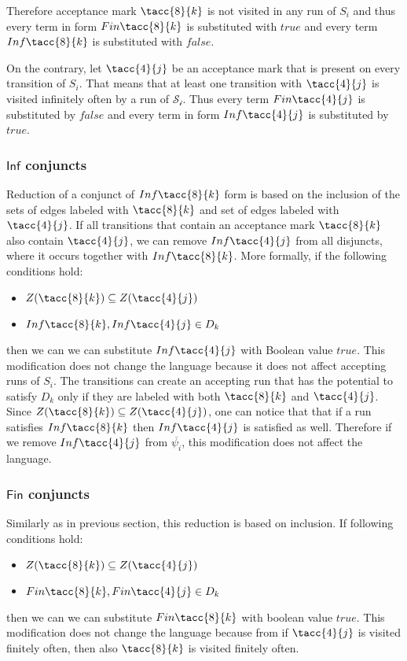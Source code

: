 \documentclass[a4paper,UKenglish,cleveref, autoref, anonymous, thm-restate]{lipics-v2021}
\def\Inf{\ensuremath{\mathsf{Inf}}}
\def\Fin{\ensuremath{\mathsf{Fin}}}
\def\false{\mathit{false}}
\def\true{\mathit{true}}
\begin{document}
Therefore acceptance mark $\tacc{8}{k}$ is not visited in any run of $S_{i}$ and thus every term in form $\Fin\tacc{8}{k}$ is substituted with $\true$ and every term $\Inf\tacc{8}{k}$ is substituted with $\false$.

On the contrary, let $\tacc{4}{j}$ be an acceptance mark that is present on every transition of $S_{i}$. That means that at least one transition with $\tacc{4}{j}$ is visited infinitely often by a run of $\mathcal{S_{i}}$. Thus every term $\Fin\tacc{4}{j}$ is substituted by $\false$ and every term in form $\Inf\tacc{4}{j}$ is substituted by $\true$. 

\subsubsection{$\Inf$ conjuncts\\}
\label{subsection:simpl_inf}
Reduction of a conjunct of $\Inf\tacc{8}{k}$ form  is based on the inclusion of the sets of edges labeled with $\tacc{8}{k}$ and set of edges labeled with $\tacc{4}{j}$. If all transitions that contain an acceptance mark $\tacc{8}{k}$ also contain $\tacc{4}{j}$, we can remove $\Inf\tacc{4}{j}$ from all disjuncts, where it occurs together with $\Inf\tacc{8}{k}$. 
More formally, if the following conditions hold:
\begin{itemize}
    \item $Z(\tacc{8}{k}) \subseteq Z(\tacc{4}{j})$
    \item $\Inf\tacc{8}{k}, \Inf\tacc{4}{j} \in D_{k}$
\end{itemize}
then we can we can substitute $\Inf\tacc{4}{j}$ with Boolean value $\true$. 
This modification does not change the language because it does not affect accepting runs of $S_{i}$. The transitions can create an accepting run that has the potential to satisfy $D_{k}$ only if they are labeled with both  $\tacc{8}{k}$  and $\tacc{4}{j}$. Since $Z(\tacc{8}{k}) \subseteq Z(\tacc{4}{j})$, one can notice that that if a run satisfies $\Inf\tacc{8}{k}$ then  $\Inf\tacc{4}{j}$ is satisfied as well. Therefore if we remove $\Inf \tacc{4}{j}$ from $\overline{\psi_{i}}$, this modification does not affect the language.

\subsubsection{$\Fin$ conjuncts\\}
Similarly as in previous section, this reduction is based on inclusion.
If following conditions hold:
\begin{itemize}
    \item $Z(\tacc{8}{k}) \subseteq Z(\tacc{4}{j})$
    \item $\Fin\tacc{8}{k}, \Fin\tacc{4}{j} \in D_{k}$
\end{itemize}
then we can we can substitute $\Fin\tacc{8}{k}$ with boolean value $\true$. This modification does not change the language because from if $\tacc{4}{j}$ is visited finitely often, then also $\tacc{8}{k}$ is visited finitely often. 
\medskip
\end{document}
